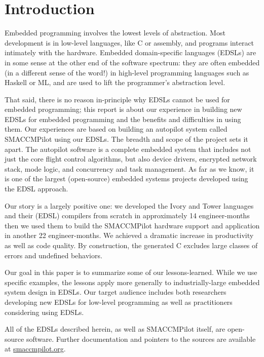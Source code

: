 \section{Introduction}

Embedded programming involves the lowest levels of abstraction.  Most development
is in low-level languages, like C or assembly, and programs interact intimately
with the hardware.  Embedded domain-specific languages (EDSLs) are in
some sense at the other end of the software spectrum: they are often embedded
(in a different sense of the word!) in high-level programming languages such as
Haskell or ML, and are used to lift the programmer's abstraction level.

That said, there is no reason in-principle why EDSLs cannot be used for embedded
programming; this report is about our experience in building new EDSLs for
embedded programming and the benefits and difficulties in using them.  Our
experiences are based on building an autopilot system called SMACCMPilot using
our EDSLs.  The breadth and scope of the project sets it apart.  The autopilot
software is a complete embedded system that
includes not just the core flight control algorithms, but also device drivers,
encrypted network stack, mode logic, and concurrency and task management.
As far as we know, it is
one of the largest (open-source) embedded systems projects developed using the
EDSL approach.

Our story is a largely positive one: we developed the Ivory and Tower languages
and their (EDSL) compilers from scratch in approximately 14 engineer-months then
we used them to build the SMACCMPilot hardware support and application in
another 22 engineer-months.  We achieved a dramatic increase in productivity as
well as code quality.  By construction, the generated C excludes large classes
of errors and undefined behaviors.

Our goal in this paper is to summarize some of our lessons-learned.  While we
use specific examples, the lessons apply more generally to industrially-large
embedded system design in EDSLs.  Our target audience includes both researchers
developing new EDSLs for low-level programming as well as practitioners
considering using EDSLs.

All of the EDSLs described herein, as well as SMACCMPilot itself, are
open-source software. Further documentation and pointers to the sources are
available at \url{smaccmpilot.org}.




